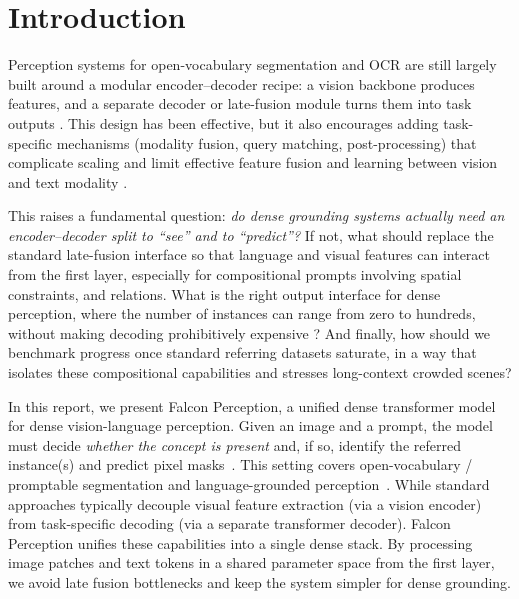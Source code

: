 
\section{Introduction}

Perception systems for open-vocabulary segmentation and OCR are still largely built around a modular encoder--decoder recipe: a vision backbone produces features, and a separate decoder or late-fusion module turns them into task outputs \citep{carion2020detr,chen2022pix2seq,kamath2021mdetr,kirillov2023segment,sam2}. This design has been effective, but it also encourages adding task-specific mechanisms (modality fusion, query matching, post-processing) that complicate scaling and limit effective feature fusion and learning between vision and text modality \citep{carion2025sam3,minderer2024scalingopenvocabularyobjectdetection,Liu2023GroundingDM,li2022grounded}.

This raises a fundamental question: \emph{do dense grounding systems actually need an encoder--decoder split to ``see'' and to ``predict''?} If not, what should replace the standard late-fusion interface so that language and visual features can interact from the first layer, especially for compositional prompts involving spatial constraints, and relations. What is the right output interface for dense perception, where the number of instances can range from zero to hundreds, without making decoding prohibitively expensive \citep{chen2022pix2seq,chen2022unified,kolesnikov2022uvim}? And finally, how should we benchmark progress once standard referring datasets saturate, in a way that isolates these compositional capabilities and stresses long-context crowded scenes?

In this report, we present Falcon Perception, a unified dense transformer model for dense vision-language perception. Given an image and a prompt, the model must decide \emph{whether the concept is present} and, if so, identify the referred instance(s) and predict pixel masks~\citep{carion2025sam3,kamath2021mdetr}. This setting covers open-vocabulary / promptable segmentation and language-grounded perception~\citep{kirillov2023segment,sam2,li2022grounded,Liu2023GroundingDM,minderer2024scalingopenvocabularyobjectdetection}. While standard approaches typically decouple visual feature extraction (via a vision encoder) from task-specific decoding (via a separate transformer decoder). Falcon Perception unifies these capabilities into a single dense stack. By processing image patches and text tokens in a shared parameter space from the first layer, we avoid late fusion bottlenecks and keep the system simpler for dense grounding.


